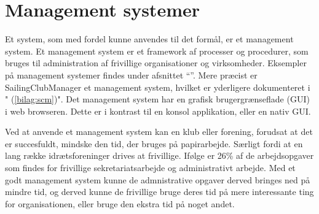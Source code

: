 \section{Management systemer}\label{sec:management-systemer}


Et system, som med fordel kunne anvendes til det formål, er et management system. Et management system er et framework af processer og procedurer, som bruges til administration af frivillige organisationer og virksomheder.  
Eksempler på management systemer findes under afsnittet ``''. 
Mere præcist er SailingClubManager et management system, hvilket er yderligere dokumenteret i "  (\ref{bilag:scm})". 
Det management system har en grafisk brugergrænseflade (GUI) i web browseren. 
Dette er i kontrast til en konsol applikation, eller en nativ GUI. 
\newline 

Ved at anvende et management system kan en klub eller forening, forudsat at det er succesfuldt, mindske den tid, der bruges på papirarbejde. Særligt fordi at en lang række idrætsforeninger drives at frivillige. 
Ifølge \cite{Frivilligrapporten} er 26\% af de arbejdsopgaver som findes for frivillige sekretariatsarbejde og administrativt arbejde. Med et godt management system kunne de admnistrative opgaver derved bringes ned på mindre tid, og derved kunne de frivillige bruge deres tid på mere interessante ting for organisationen, eller bruge den ekstra tid på noget andet.




